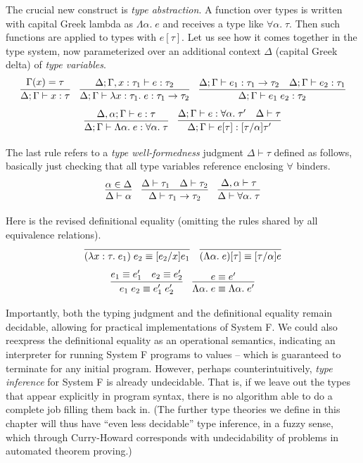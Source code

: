 \documentclass{amsbook}
\theoremstyle{definition}
\theoremstyle{remark}
\numberwithin{section}{chapter}
\numberwithin{equation}{chapter}
\begin{document}
\newcommand{\pwf}[2]{#1 \vdash #2}
\newcommand{\phasty}[4]{#1; #2 \vdash #3 : #4}

The crucial new construct is \emph{type abstraction}.
A function over types is written with capital Greek lambda as $\Lambda \alpha. \; e$ and receives a type like $\forall \alpha. \; \tau$.
Then such functions are applied to types with $e[\tau]$.
Let us see how it comes together in the type system, now parameterized over an additional context $\Delta$ (capital Greek delta) of \emph{type variables}.
$$\infer{\phasty{\Delta}{\Gamma}{x}{\tau}}{
  \msel{\Gamma}{x} = \tau
}
\quad \infer{\phasty{\Delta}{\Gamma}{\lambda x : \tau_1. \; e}{\tau_1 \to \tau_2}}{
  \phasty{\Delta}{\Gamma, x : \tau_1}{e}{\tau_2}
}
\quad \infer{\phasty{\Delta}{\Gamma}{e_1 \; e_2}{\tau_2}}{
  \phasty{\Delta}{\Gamma}{e_1}{\tau_1 \to \tau_2}
  & \phasty{\Delta}{\Gamma}{e_2}{\tau_1}
}$$
$$\infer{\phasty{\Delta}{\Gamma}{\Lambda \alpha. \; e}{\forall \alpha. \; \tau}}{
  \phasty{\Delta, \alpha}{\Gamma}{e}{\tau}
}
\quad \infer{\phasty{\Delta}{\Gamma}{e[\tau]}{\subst{\tau'}{\alpha}{\tau}}}{
  \phasty{\Delta}{\Gamma}{e}{\forall \alpha. \; \tau'}
  & \pwf{\Delta}{\tau}
}$$

The last rule refers to a \emph{type well-formedness} judgment $\pwf{\Delta}{\tau}$ defined as follows, basically just checking that all type variables reference enclosing $\forall$ binders.
$$\infer{\pwf{\Delta}{\alpha}}{
  \alpha \in \Delta
}
\quad \infer{\pwf{\Delta}{\tau_1 \to \tau_2}}{
  \pwf{\Delta}{\tau_1}
  & \pwf{\Delta}{\tau_2}
}
\quad \infer{\pwf{\Delta}{\forall \alpha. \; \tau}}{
  \pwf{\Delta, \alpha}{\tau}
}$$

Here is the revised definitional equality (omitting the rules shared by all equivalence relations).
$$\infer{(\lambda x : \tau. \; e_1) \; e_2 \equiv \subst{e_1}{x}{e_2}}{}
\quad \infer{(\Lambda \alpha. \; e)[\tau] \equiv \subst{e}{\alpha}{\tau}}{}$$
$$\infer{e_1 \; e_2 \equiv e'_1 \; e'_2}{
  e_1 \equiv e'_1
  & e_2 \equiv e'_2
}
\quad \infer{\Lambda \alpha. \; e \equiv \Lambda \alpha. \; e'}{
  e \equiv e'
}$$

Importantly, both the typing judgment and the definitional equality remain decidable, allowing for practical implementations of System F.
We could also reexpress the definitional equality as an operational semantics, indicating an interpreter for running System F programs to values -- which is guaranteed to terminate for any initial program.
However, perhaps counterintuitively, \emph{type inference} for System F is already undecidable.
That is, if we leave out the types that appear explicitly in program syntax, there is no algorithm able to do a complete job filling them back in.
(The further type theories we define in this chapter will thus have ``even less decidable'' type inference, in a fuzzy sense, which through Curry-Howard corresponds with undecidability of problems in automated theorem proving.)
\end{document}
